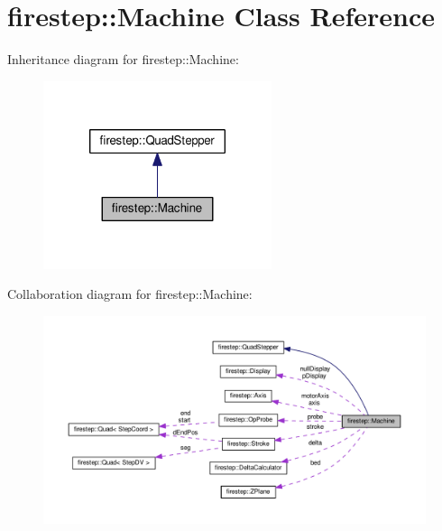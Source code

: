 \hypertarget{classfirestep_1_1_machine}{\section{firestep\+:\+:Machine Class Reference}
\label{classfirestep_1_1_machine}
}


Inheritance diagram for firestep\+:\+:Machine\+:\nopagebreak
\begin{figure}[H]
\begin{center}
\leavevmode
\includegraphics[width=190pt]{classfirestep_1_1_machine__inherit__graph}
\end{center}
\end{figure}


Collaboration diagram for firestep\+:\+:Machine\+:
\nopagebreak
\begin{figure}[H]
\begin{center}
\leavevmode
\includegraphics[width=350pt]{classfirestep_1_1_machine__coll__graph}
\end{center}
\end{figure}
